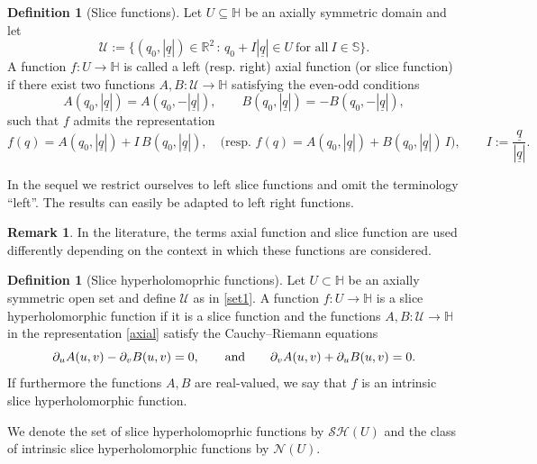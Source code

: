 \documentclass[reqno,11pt]{amsart}
\theoremstyle{definition}
\newtheorem{definition}[theorem]{Definition}
\newtheorem{remark}[theorem]{Remark}
\begin{document}
\begin{definition}[Slice functions]
\label{axial1}
	Let $U \subseteq \mathbb{H}$ be an axially symmetric domain and let
	\begin{equation}
		\label{set1}
		\mathcal{U}:= \big\{(q_0, |\underline{q}|)\in \mathbb{R}^2 \, : \, q_0+I |\underline{q}| \in U \ \text{for all} \ I \in \mathbb{S}\big\}.
	\end{equation}
	A function $f:U \to \mathbb{H}$ is called a left (resp. right) axial function (or slice function) if there exist two functions $A,B:\mathcal{U}\to\mathbb{H}$ satisfying the even-odd conditions
	\begin{equation}
		\label{co1}
		A(q_0,|\underline{q}|)=A(q_0,-|\underline{q}|), \qquad
		B(q_0,|\underline{q}|)=-B(q_0,-|\underline{q}|),
	\end{equation}
	such that $f$ admits the representation
	\begin{equation}
		\label{axial}
		f(q)=A(q_0,|\underline{q}|)+I\,B(q_0,|\underline{q}|),
		\quad
		\big(\text{resp. } f(q)=A(q_0,|\underline{q}|)+B(q_0,|\underline{q}|)\,I\big), \qquad 	I:=\frac{\underline{q}}{|\underline{q}|}.
	\end{equation}
\end{definition}

In the sequel we restrict ourselves to left slice functions and omit the terminology ``left''. The results can easily be adapted to left right functions.

\begin{remark}
In the literature, the terms axial function and slice function are used differently depending on the context in which these functions are considered.
\end{remark}

\begin{definition}[Slice hyperholomoprhic functions]
	Let $U \subset \mathbb{H}$ be an axially symmetric open set and define $ \mathcal{U}$ as in \eqref{set1}. A function $f:U \to \mathbb{H}$ is a slice hyperholomorphic function if it is a slice function and the functions $A, B: \mathcal{U} \to \mathbb{H}$ in the representation \eqref{axial} satisfy the Cauchy--Riemann equations
	\[
	\partial_u A(u,v)- \partial_v B(u,v)=0, \qquad \hbox{and} \qquad \partial_v A(u,v)+\partial_u B(u,v)=0.
	\]
	If furthermore the functions $A,B$ are real-valued, we say that $f$ is an intrinsic slice hyperholomorphic function.
\end{definition}
We denote the set of  slice hyperholomoprhic functions by  $\mathcal{SH}(U)$ and the class of  intrinsic slice hyperholomorphic functions by $\mathcal{N}(U)$.
\end{document}
